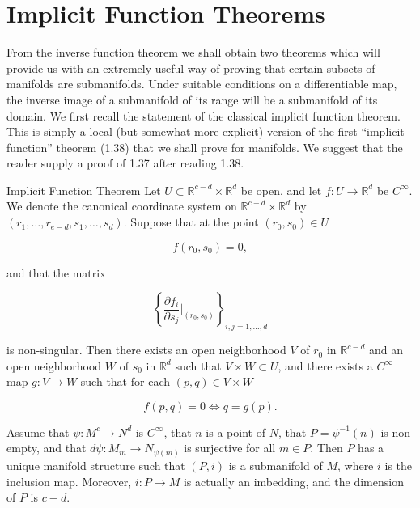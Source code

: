 \section{Implicit Function Theorems}


From the inverse function theorem we shall obtain two theorems which will provide us with an extremely useful way of proving that certain subsets of manifolds are submanifolds. Under suitable conditions on a differentiable map, the inverse image of a submanifold of its range will be a submanifold of its domain. We first recall the statement of the classical implicit function theorem. This is simply a local (but somewhat more explicit) version of the first ``implicit function'' theorem (1.38) that we shall prove for manifolds. We suggest that the reader supply a proof of 1.37 after reading 1.38. 

\begin{theorem}{Implicit Function Theorem}\label{thm:1.37}
	Let  $ U \subset \mathbb{R}^{c-d} \times \mathbb{R}^{d} $ be open, and let  $ f: U \to \mathbb{R}^{d} $ be  $ C^{\infty} $. We denote the canonical coordinate system on  $ \mathbb{R}^{c-d} \times \mathbb{R}^{d} $ by  $ (r_{1}, \ldots, r_{e-d}, s_{1}, \ldots, s_{d}) $. Suppose that at the point  $ (r_{0}, s_{0}) \in U $

	\[
		f(r_{0},s_{0})=0,
	\]

	and that the matrix

	\[
		\left\{\frac{\partial f_{i}}{\partial s_{j}}\bigg|_{(r_{0},s_{0})}\right\}_{i,j=1,\ldots,d}
	\]

	is non-singular. Then there exists an open neighborhood $V$ of $r_0$ in $\mathbb{R}^{c-d}$ and an open neighborhood $W$ of $s_0$ in $\mathbb{R}^d$ such that $V \times W \subset U$, and there exists a $C^\infty$ map $g: V \to W$ such that for each $(p,q) \in V \times W$

	\begin{equation}
		\tag{1}\label{eq:1.37:1}
		f(p,q)=0\iff q=g(p).
	\end{equation}

	\begin{center}
	\end{center}
\end{theorem}

\begin{theorem}\label{thm:1.38}
	Assume that $\psi\colon M^{c} \to N^{d}$ is $C^{\infty}$, that $n$ is a point of $N$, that $P = \psi^{-1}(n)$ is non-empty, and that $d\psi: M_{m} \to N_{\psi(m)}$ is surjective for all $m \in P$. Then $P$ has a unique manifold structure such that $(P, i)$ is a submanifold of $M$, where $i$ is the inclusion map. Moreover, $i: P \to M$ is actually an imbedding, and the dimension of $P$ is $c - d$.

\end{theorem}

